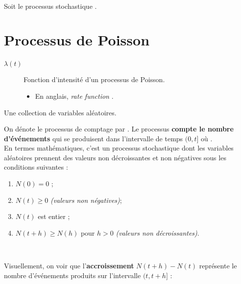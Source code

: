 \documentclass[10pt, french]{article}
\begin{document}
\begin{multicols*}{2}
\begin{definitionNOHFILL}
Soit le processus stochastique .
\end{definitionNOHFILL}


\columnbreak
\section{Processus de Poisson}
\label{sec:procPois}
\begin{distributions}[Notation]
\begin{description}
	\item[$\lambda(t)$]	Fonction d'intensité d'un processus de Poisson.
		\begin{itemize}
		\item	En anglais, \og \textit{rate function} \fg{}.
		\end{itemize}
\end{description}
\end{distributions}
\begin{definitionNOHFILL}
Une collection de variables aléatoires.
\end{definitionNOHFILL}

\begin{definitionNOHFILLsub}
On dénote le processus de comptage par . Le processus \textbf{compte le nombre d'événements} qui se produisent dans l'intervalle de temps $(0, t]$ où .\\

En termes mathématiques, c'est un processus stochastique dont les variables aléatoires prennent des valeurs non décroissantes et non négatives sous les conditions suivantes :
\begin{enumerate}
	\item	$N(0) = 0$ ;
	\item	$N(t) \geq 0$ \textit{(valeurs non négatives)};
	\item	$N(t)$ est entier ;
	\item	$N(t + h) \geq N(h)$ pour $h	>	0$ \textit{(valeurs non décroissantes)}.
\end{enumerate}

\

Visuellement, on voir que l'\textbf{accroissement} $N(t + h) - N(t)$ représente le nombre d'événements produits sur l'intervalle $(t, t + h]$ :
\begin{center}
\begin{tikzpicture}[x=0.75pt,y=0.75pt,yscale=-1,xscale=1]


\end{tikzpicture}
\end{center}
\end{definitionNOHFILLsub}
\end{multicols*}
\end{document}
